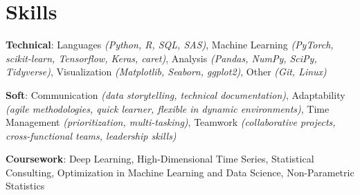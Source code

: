 \documentclass[letterpaper,11pt]{article}
\newcommand{\resumeItem}[1]{
  \item\small{
    {#1 \vspace{-2pt}}
  }
}
\newcommand{\resumeSubItem}[1]{\resumeItem{#1}\vspace{-4pt}}
\begin{document}
\section{Skills}
 \begin{itemize}[leftmargin=0.15in, label={}]
    \small{
        \resumeSubItem{
            \textbf{Technical}{: Languages \textit{(Python, R, SQL, SAS)}, Machine Learning \textit{(PyTorch, scikit-learn, Tensorflow, Keras, caret)}, Analysis \textit{(Pandas, NumPy, SciPy, Tidyverse)}, Visualization \textit{(Matplotlib, Seaborn, ggplot2)}, Other \textit{(Git, Linux)}}
        }
        \resumeSubItem{
            \textbf{Soft}{: Communication \textit{(data storytelling, technical documentation)}, Adaptability \textit{(agile methodologies, quick learner, flexible in dynamic environments)}, Time Management \textit{(prioritization, multi-tasking)}, Teamwork \textit{(collaborative projects, cross-functional teams, leadership skills)}}
        }
        \resumeSubItem{
            \textbf{Coursework}{: Deep Learning, High-Dimensional Time Series, Statistical Consulting, Optimization in Machine Learning and Data Science, Non-Parametric Statistics}        
        }
    }
 \end{itemize}

% 
\end{document}
